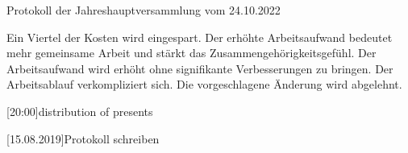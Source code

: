 \documentclass{scrartcl}
\begin{document}
\begin{Minutes}{Protokoll der Jahreshauptversammlung vom 24.10.2022}
  \begin{Argumentation}
    \Pro Ein Viertel der Kosten wird eingespart.
    \pro Der erhöhte Arbeitsaufwand bedeutet mehr gemeinsame Arbeit und stärkt das Zusammengehörigkeitsgefühl.
    \Contra Der Arbeitsaufwand wird erhöht ohne signifikante Verbesserungen zu bringen.
    \contra Der Arbeitsablauf verkompliziert sich.
    \result Die vorgeschlagene Änderung wird abgelehnt.
  \end{Argumentation}

  \begin{Vote}
  \end{Vote}



  [20:00]{distribution of presents}






  [15.08.2019]{Protokoll schreiben}


  \signature{Martin Muster}
  \signature{Petra Peterson}
\end{Minutes}

\end{document}
